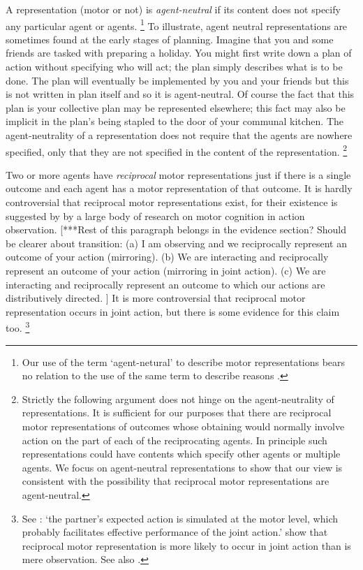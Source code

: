\documentclass[12pt,\papersize]{extarticle}
\begin{document}
A representation (motor or not) is \emph{agent-neutral} if its content does not specify any particular agent or agents.%
\footnote{
Our use of the term `agent-netural' to describe motor representations bears no relation to the use of the same term  to describe reasons \citep[on the latter, see][]{Parfit:1984fk}.
}
To illustrate, agent neutral representations are sometimes found at the early stages of planning.
Imagine that you and some friends are tasked with preparing a holiday.  
You might first write down a plan of action without specifying who will act; the plan simply describes what is to be done.
The plan  will eventually be implemented by you and your friends
 but this is not written in plan itself  and so it is agent-neutral.
Of course the fact that this plan is your collective plan may be represented elsewhere; this fact may also be implicit in  the plan's being stapled to the door of your communal kitchen.
The agent-neutrality of a representation does not require that the agents are nowhere specified, only that they are not specified in the content of the representation.%
\footnote{
Strictly the following argument does not hinge on the agent-neutrality of representations.
It is sufficient for our purposes that there are reciprocal motor representations  of outcomes whose obtaining would normally involve action on the part of each of the reciprocating agents.
In principle such representations could have contents which specify other agents or multiple agents. 
We focus on agent-neutral representations to show that our view is consistent with the possibility that reciprocal motor representations are agent-neutral. 
}

Two or more agents have \emph{reciprocal} motor representations  just if there is a single outcome and each agent has a motor representation of that outcome. 
It is hardly controversial that reciprocal motor representations exist, for their existence is suggested by by a large body of research on motor cognition in action observation.
[***Rest of this paragraph belongs in the evidence section?
Should be clearer about transition:
(a) I am observing and we reciprocally represent an outcome of your action (mirroring).
(b) We are interacting and reciprocally represent an outcome of your action (mirroring in joint action).
(c) We are interacting and reciprocally represent an outcome to which our actions are distributively directed.%
] 
It is more controversial that reciprocal motor representation occurs in joint action, but there is some evidence for this claim too.%
\footnote{
See \citet{kourtis:2012_predictive}: `the partner’s expected action is simulated at the motor level, which probably facilitates effective performance of the joint action.'
\citet{kourtis:2010_favoritism} show that 
reciprocal motor representation is more likely to occur in joint action than is mere observation. 
See also \citet{Knoblich:2003nf}.
 }
\end{document}
